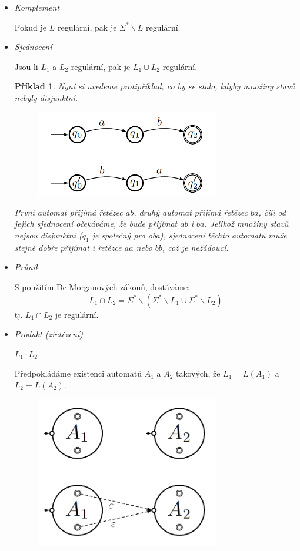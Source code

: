 \documentclass[10pt,a4paper]{article}
\theoremstyle{note}
\newtheorem{priklad}{Příklad}
\begin{document}
\begin{itemize}
\item
\textit{Komplement}

Pokud je $L$ regulární, pak je $\Sigma^* \backslash L$ regulární.


\item
\textit{Sjednocení} 

Jsou-li $L_1$ a $L_2$ regulární, pak je $L_1 \cup L_2$ regulární.


\begin{priklad}
Nyní si uvedeme protipříklad, co by se stalo, kdyby množiny stavů nebyly disjunktní.

\begin{figure}[H]
\centering
\includegraphics[width=8cm]{img/reg5.png}
\end{figure}

První automat přijímá řetězec $ab$, druhý automat přijímá řetězec $ba$, čili od jejich sjednocení očekáváme, že bude přijímat $ab$ i $ba$. Jelikož množiny stavů nejsou disjunktní ($q_1$ je společný pro oba), sjednocení těchto automatů může stejně dobře přijímat i řetězce $aa$ nebo $bb$, což je nežádoucí.
\end{priklad}

\item
\textit{Průnik} 

S použitím De Morganových zákonů, dostáváme:
$$L_1 \cap L_2 = \Sigma^* \backslash (\Sigma^* \backslash L_1 \cup \Sigma^* \backslash L_2 )$$
tj. $L_1 \cap L_2$ je regulární.


\item
\textit{Produkt (zřetězení)} 

$L_1 \cdot L_2$

Předpokládáme existenci automatů $A_1$ a $A_2$ takových, že $L_1 = L(A_1)$ a $L_2 = L(A_2) $.

\begin{figure}[H]
\centering
\includegraphics[width=8cm]{img/reg6.png}
\end{figure}


\end{itemize}
\end{document}
